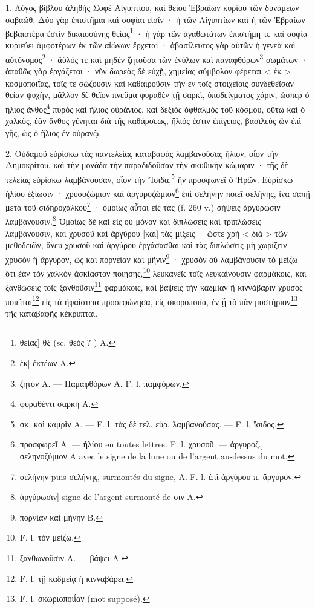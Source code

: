 \documentclass[landscape, a4paper, 11pt, oneside, polutonikogreek, french]{article}
\begin{document}
\bigskip

1. Λόγος βίβλου ἀληθὴς Σοφὲ Αἰγυπτίου, καὶ θείου Ἑβραίων κυρίου τῶν δυνάμεων σαβαώθ. Δύο γὰρ ἐπιστῆμαι καὶ σοφίαι εἰσίν · ἡ τῶν Αἰγυπτίων καὶ ἡ τῶν Ἑβραίων βεβαιοτέρα ἐστὶν δικαιοσύνης θείας\footnote{θείας] θξ (sc. θεὸς ? ) A.} · ἡ γὰρ τῶν ἀγαθωτάτων ἐπιστήμη τε καὶ σοφία κυριεύει ἀμφοτέρων ἐκ τῶν αἰώνων ἔρχεται · ἀβασίλευτος γὰρ αὐτῶν ἡ γενεὰ καὶ αὐτόνομος\footnote{ἐκ] ἐκτέων A.} · ἄϋλός τε καὶ μηδὲν ζητοῦσα τῶν ἐνύλων καὶ παναφθόρων\footnote{ζητὸν A. --- Παμαφθόρων A. F. l. παμφόρων.} σωμάτων · ἀπαθῶς γὰρ ἐργάζεται · νῦν δωρεὰς δὲ εὐχῇ, χημείας σύμβολον φέρεται < ἐκ > κοσμοποιΐας, τοῖς τε σώζουσιν καὶ καθαιροῦσιν τὴν ἐν τοῖς στοιχείοις συνδεθεῖσαν θείαν ψυχὴν, μᾶλλον δὲ θεῖον πνεῦμα φυραθὲν τῇ σαρκὶ, ὑποδείγματος χάριν, ὥσπερ ὁ ἥλιος ἄνθος\footnote{φυραθέντι σαρκὴ A.} πυρὸς καὶ ἥλιος οὐράνιος, καὶ δεξιὸς ὀφθαλμὸς τοῦ κόσμου, οὕτω καὶ ὁ χαλκὸς, ἐὰν ἄνθος γένηται διὰ τῆς καθάρσεως, ἥλιός ἐστιν ἐπίγειος, βασιλεὺς ὢν ἐπὶ γῆς, ὡς ὁ ἥλιος ἐν οὐρανῷ.

2. Οὐδαμοῦ εὑρίσκω τὰς παντελείας καταβαφὰς λαμβανούσας ἥλιον, οἷον τὴν Δημοκρίτου, καὶ τὴν μονάδα τὴν παραδιδοῦσαν τὴν σκυθικὴν κώμαριν · τῆς δὲ τελείας εὑρίσκω λαμβάνουσαν, οἷον τὴν Ἴσιδα,\footnote{σκ. καὶ καμρὶν A. --- F. l. τὰς δὲ τελ. εὑρ. λαμβανούσας. --- F. l. ἴσιδος.} ἣν προσφωνεῖ ὁ Ἡρῶν. Εὑρίσκω ἡλίου ἐξίωσιν · χρυσοζώμιον καὶ ἀργυροζώμιον\footnote{προσφωρεῖ A. --- ἡλίου en toutes lettres. F. l. χρυσοῦ. --- ἀργυροζ.] σεληνοζύμιον A avec le signe de la lune ou de l'argent au-dessus du mot.} ἐπὶ σελήνην ποιεῖ σελήνης, ἵνα σαπῇ μετὰ τοῦ σιδηροχάλκου\footnote{σελήνην puis σελήνης, surmontés du signe, A. F. l. ἐπὶ ἀργύρου π. ἄργυρον.} · ὁμοίως αὗται εἰς τὰς (f. 260 v.) σήψεις ἀργύρωσιν λαμβάνουσιν.\footnote{ἀργύρωσιν] signe de l'argent surmonté de σιν A.} Ὁμοίως δὲ καὶ εἰς οὐ μόνον καὶ διπλώσεις καὶ τριπλώσεις λαμβάνουσιν, καὶ χρυσοῦ καὶ ἀργύρου [καὶ] τὰς μίξεις · ὥστε χρὴ < διὰ > τῶν μεθοδειῶν, ἄνευ χρυσοῦ καὶ ἀργύρου ἐργάσασθαι καὶ τὰς διπλώσεις μὴ χωρίζειν χρυσὸν ἢ ἄργυρον, ὡς καὶ πορνείαν καὶ μῆνιν\footnote{πορνίαν καὶ μήνην B.} · χρυσὸν οὐ λαμβάνουσιν τὸ μείζω ὅτι ἐὰν τὸν χαλκὸν ἀσκίαστον ποιήσῃς,\footnote{F. l. τὸν μείζω.} λευκανεῖς τοῖς λευκαίνουσιν φαρμάκοις, καὶ ξανθώσεις τοῖς ξανθοῦσιν\footnote{ξανθωνοῦσιν A. --- βάψει A.} φαρμάκοις, καὶ βάψεις τὴν καδμίαν ἢ κιννάβαριν χρυσὸς ποιεῖται\footnote{F. l. τῇ καδμείᾳ ἢ κινναβάρει.} εἰς τὰ ἡφαίστεια προσεφώνησα, εἰς σκοροποιία, ἐν ᾗ τὸ πᾶν μυστήριον\footnote{F. l. σκωριοποιΐαν (mot supposé).} τῆς καταβαφῆς κέκρυπται.
\end{document}
